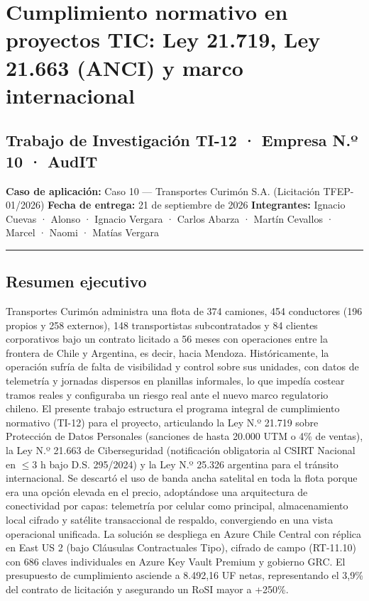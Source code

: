\section{Cumplimiento normativo en proyectos TIC: Ley 21.719, Ley 21.663 (ANCI) y marco internacional}\label{cumplimiento-normativo-en-proyectos-tic-ley-21.719-ley-21.663-anci-y-marco-internacional}

\subsection{Trabajo de Investigación TI-12 · Empresa N.º 10 · AudIT}\label{trabajo-de-investigaciuxf3n-ti-12-empresa-n.uxba-10-audit}

\textbf{Caso de aplicación:} Caso 10 --- Transportes Curimón S.A. (Licitación TFEP-01/2026) \textbf{Fecha de entrega:} 21 de septiembre de 2026 \textbf{Integrantes:} Ignacio Cuevas · Alonso · Ignacio Vergara · Carlos Abarza · Martín Cevallos · Marcel · Naomi · Matías Vergara

\begin{center}\rule{0.5\linewidth}{0.5pt}\end{center}

\subsection{Resumen ejecutivo}\label{resumen-ejecutivo}

Transportes Curimón administra una flota de 374 camiones, 454 conductores (196 propios y 258 externos), 148 transportistas subcontratados y 84 clientes corporativos bajo un contrato licitado a 56 meses con operaciones entre la frontera de Chile y Argentina, es decir, hacia Mendoza. Históricamente, la operación sufría de falta de visibilidad y control sobre sus unidades, con datos de telemetría y jornadas dispersos en planillas informales, lo que impedía costear tramos reales y configuraba un riesgo real ante el nuevo marco regulatorio chileno. El presente trabajo estructura el programa integral de cumplimiento normativo (TI-12) para el proyecto, articulando la Ley N.º 21.719 sobre Protección de Datos Personales (sanciones de hasta 20.000 UTM o 4\% de ventas), la Ley N.º 21.663 de Ciberseguridad (notificación obligatoria al CSIRT Nacional en \(\le 3\text{ h}\) bajo D.S. 295/2024) y la Ley N.º 25.326 argentina para el tránsito internacional. Se descartó el uso de banda ancha satelital en toda la flota porque era una opción elevada en el precio, adoptándose una arquitectura de conectividad por capas: telemetría por celular como principal, almacenamiento local cifrado y satélite transaccional de respaldo, convergiendo en una vista operacional unificada. La solución se despliega en Azure Chile Central con réplica en East US 2 (bajo Cláusulas Contractuales Tipo), cifrado de campo (RT-11.10) con 686 claves individuales en Azure Key Vault Premium y gobierno GRC. El presupuesto de cumplimiento asciende a 8.492,16 UF netas, representando el 3,9\% del contrato de licitación y asegurando un RoSI mayor a +250\%.

